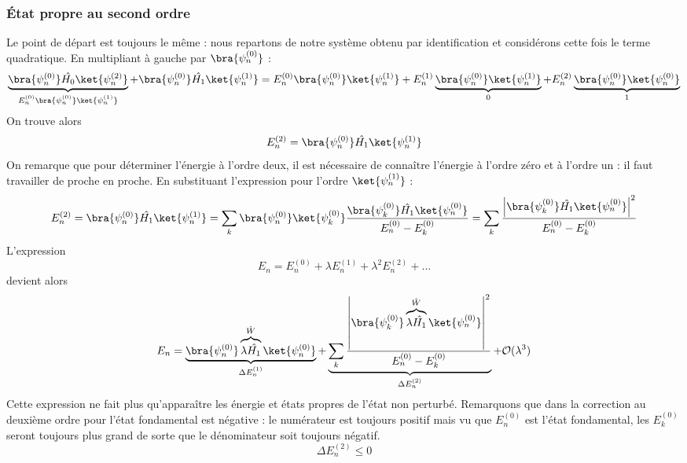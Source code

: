 		\subsubsection{État propre au second ordre}
		Le point de départ est toujours le même :  nous repartons de notre 
		système obtenu par identification et considérons cette fois le terme
		quadratique. En multipliant à gauche par $\bra{\psi_n^{(0)}}$ :
		\begin{equation}
		\underbrace{\bra{\psi_n^{(0)}}\hat{H_0}\ket{\psi_n^{(2)}}}_{E_n^{(0
		)}\bra{\psi_n^{(0)}}\ket{\psi_n^{(1)}}}+\bra{\psi_n^{(0)}}\hat{H_1}\ket{\psi_n^{(1)}} =
		 E_n^{(0	)}\bra{\psi_n^{(0)}}\ket{\psi_n^{(1)}}+E_n^{(1)}\underbrace{
		 \bra{\psi_n^{(0)}}\ket{\psi_n^{(1)}}}_{0}+E_n^{(2)}
		\underbrace{\bra{\psi_n^{(0)}}\ket{\psi_n^{(0)}}}_{1}
		\end{equation}
		On trouve alors
		\begin{equation}
		E_n^{(2)} = \bra{\psi_n^{(0)}}\hat{H_1}\ket{\psi_n^{(1)}}
		\end{equation}
		On remarque que pour déterminer l'énergie à l'ordre deux, il est nécessaire de 
		connaître l'énergie à l'ordre zéro et à l'ordre un : il faut travailler de proche
		en proche. En substituant l'expression pour l'ordre $\ket{\psi_n^{(1)}}$ : 
		\begin{equation}
		E_n^{(2)} = \bra{\psi_n^{(0)}}\hat{H_1}\ket{\psi_n^{(1)}} = \sum_k
		\bra{\psi_n^{(0)}}\ket{\psi_k^{(0)}}
		\dfrac{\bra{\psi_k^{(0)}}\hat{H_1}\ket{\psi_n^{(0)}}}{	E_n^{(0)}-E_k^{(0)}} =
		\sum_k \dfrac{\left|\bra{\psi_k^{(0)}}\hat{H_1}\ket{\psi_n^{(0)}}\right|^2}
		{E_n^{(0)}-E_k^{(0)}}
		\end{equation}
		L'expression
		\begin{equation}
		E_n = E_n^{(0)}+\lambda E_n^{(1)}+\lambda^2E_n^{(2)}+\dots
		\end{equation}
		devient alors
		\begin{equation}
		E_n = \underbrace{\bra{\psi_n^{(0)}}\overbrace{\lambda\hat{H_1}}^{\hat{W}}\ket{\psi_n^{(0)}}}_{\Delta 
		E_n^{(1)}}
		 + 
		\underbrace{\sum_k \dfrac{\left|\bra{\psi_k^{(0)}}\overbrace{\lambda\hat{H_1}}^{\hat{W}}\ket{\psi_n^{(0)}}\right|^2}
		{E_n^{(0)}-E_k^{(0)}}}_{\Delta 
		E_n^{(2)}} +
		\mathcal{O}(\lambda^3)
		\end{equation}	
		Cette expression ne fait plus qu'apparaître les énergie et états propres de 
		l'état non perturbé. Remarquons que dans la correction au 	deuxième ordre pour 
		l'état fondamental est négative : le numérateur est toujours positif mais vu 
		que $E_n^{(0)}$ est l'état fondamental, les $E_k^{(0)}$ seront toujours plus grand 
		de sorte que le dénominateur soit toujours négatif.
		\begin{equation}
		\Delta E_n^{(2)} \leq 0
		\end{equation}
		
